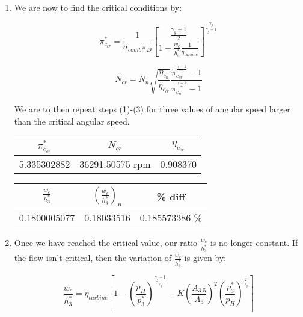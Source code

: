 \documentclass[titlepage]{article}
\begin{document}
\begin{enumerate}
  \item We are now to find the critical conditions by:
  
  \begin{equation}
    \pi_{c_{cr}}^{*} = \frac{1}{\sigma_{comb} \pi_{D}} \left[ \frac{\frac{\gamma_{g}+1}{2}}{1 - \frac{w_{c}}{h_{3}^{*}} \frac{1}{\eta_{turbine}}} \right]^{\frac{\gamma_{g}}{\gamma_{g}-1}}
  \end{equation}

  \begin{equation}
    N_{cr} = N_{n} \sqrt{\frac{\eta_{c_{n}}}{\eta_{c_{cr}}}} \frac{\pi_{c_{cr}}^{\frac{\gamma - 1}{\gamma}} -1}{\pi_{c_{n}}^{\frac{\gamma -1}{\gamma}} - 1}
  \end{equation}

  We are to then repeat steps (1)-(3) for three values of angular speed
  larger than the critical angular speed.

  \begin{center}
    \begin{tabular}{|c|c|c|}
      \hline
      $\pi_{c_{cr}}^{*}$ & $N_{cr}$ & $\eta_{c_{cr}}$ \\
      \hline
      5.335302882 & 36291.50575 rpm & 0.908370 \\
      \hline
    \end{tabular}
  \end{center}

  \begin{center}
    \begin{tabular}{|c|c|c|}
      \hline
      $\frac{w_{c}}{h_{3}^{*}}$ & $\left(\frac{w_{c}}{h_{3}^{*}}\right)_{n}$ & \% diff \\
      \hline
      0.1800005077 & 0.18033516 & 0.185573386 \% \\
      \hline
    \end{tabular}
  \end{center}

  \item Once we have reached the critical value, our ratio $\frac{w_{c}}{h_{3}^{*}}$ is no longer constant. If the flow isn't critical,
  then the variation of $\frac{w_{c}}{h_{3}^{*}}$ is given by:

  \begin{equation}
    \frac{w_{c}}{h_{3}^{*}} = \eta_{turbine} \left[ 1 - \left(\frac{p_{H}}{p_{3}^{*}}\right)^{\frac{\gamma_{g}-1}{\gamma_{g}}} - K \left(\frac{A_{3.5}}{A_{5}}\right)^{2} \left(\frac{p_{3}^{*}}{p_{H}}\right)^{\frac{2}{\gamma_{g}}} \right] 
  \end{equation}
  

\end{enumerate}
\end{document}
